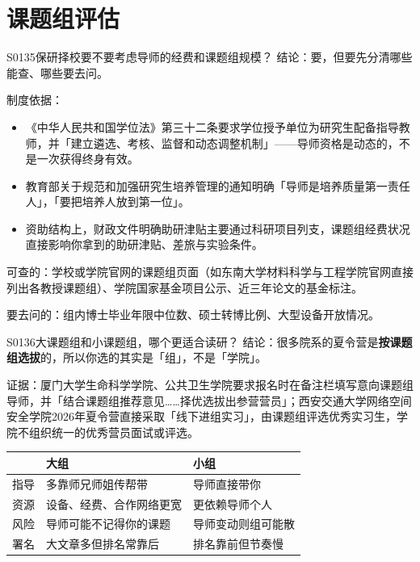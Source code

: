 \section{课题组评估}
\begin{qa}{S0135}{保研择校要不要考虑导师的经费和课题组规模？}
结论：要，但要先分清哪些能查、哪些要去问。

制度依据：
\begin{itemize}
  \item 《中华人民共和国学位法》第三十二条要求学位授予单位为研究生配备指导教师，并「建立遴选、考核、监督和动态调整机制」——导师资格是动态的，不是一次获得终身有效。
  \item 教育部关于规范和加强研究生培养管理的通知明确「导师是培养质量第一责任人」，「要把培养人放到第一位」。
  \item 资助结构上，财政文件明确助研津贴主要通过科研项目列支，课题组经费状况直接影响你拿到的助研津贴、差旅与实验条件。
\end{itemize}

可查的：学校或学院官网的课题组页面（如东南大学材料科学与工程学院官网直接列出各教授课题组）、学院国家基金项目公示、近三年论文的基金标注。

要去问的：组内博士毕业年限中位数、硕士转博比例、大型设备开放情况。
\end{qa}

\begin{qa}{S0136}{大课题组和小课题组，哪个更适合读研？}
结论：很多院系的夏令营是\textbf{按课题组选拔}的，所以你选的其实是「组」，不是「学院」。

证据：厦门大学生命科学学院、公共卫生学院要求报名时在备注栏填写意向课题组导师，并「结合课题组推荐意见……择优选拔出参营营员」；西安交通大学网络空间安全学院2026年夏令营直接采取「线下进组实习」，由课题组评选优秀实习生，学院不组织统一的优秀营员面试或评选。

\par\vspace{2pt}\nobreak\begin{center}\footnotesize
\begin{tabularx}{\textwidth}{>{\raggedright\arraybackslash}X>{\raggedright\arraybackslash}X>{\raggedright\arraybackslash}X}
\toprule
\textbf{} & \textbf{大组} & \textbf{小组} \\ \midrule
指导 & 多靠师兄师姐传帮带 & 导师直接带你 \\
资源 & 设备、经费、合作网络更宽 & 更依赖导师个人 \\
风险 & 导师可能不记得你的课题 & 导师变动则组可能散 \\
署名 & 大文章多但排名常靠后 & 排名靠前但节奏慢 \\
\bottomrule
\end{tabularx}
\end{center}\vspace{2pt}\par
{}
\end{qa}


